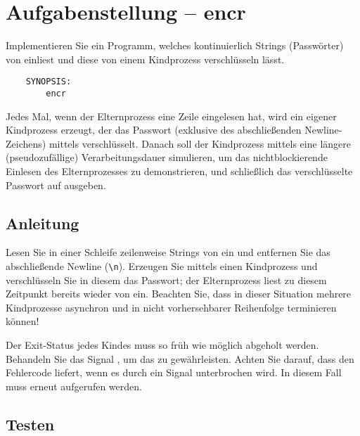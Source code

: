 




\section*{Aufgabenstellung -- encr}

Implementieren Sie ein Programm, welches kontinuierlich Strings
(Passwörter) von  einliest und diese von einem Kindprozess
verschlüsseln lässt.

\begin{verbatim}
    SYNOPSIS:
        encr
\end{verbatim}

Jedes Mal, wenn der Elternprozess eine Zeile eingelesen hat, wird ein
eigener Kindprozess erzeugt, der das Passwort (exklusive des
abschließenden Newline-Zeichens) mittels 
verschlüsselt. Danach soll der Kindprozess mittels 
eine längere (pseudozufällige) Verarbeitungsdauer simulieren, um das
nichtblockierende Einlesen des Elternprozesses zu demonstrieren, und
schließlich das verschlüsselte Passwort auf  ausgeben.

\subsection*{Anleitung}

Lesen Sie in einer Schleife zeilenweise Strings von  ein
und entfernen Sie das abschließende Newline (\verb+\n+). Erzeugen Sie
mittels  einen Kindprozess und verschlüsseln Sie in
diesem das Passwort; der Elternprozess liest zu diesem Zeitpunkt
bereits wieder von  ein. Beachten Sie, dass in dieser
Situation mehrere Kindprozesse asynchron und in nicht vorhersehbarer
Reihenfolge terminieren können!

Der Exit-Status jedes Kindes muss so früh wie möglich abgeholt werden.
Behandeln Sie das Signal , um das zu gewährleisten.
Achten Sie darauf, dass  den Fehlercode 
liefert, wenn es durch ein Signal unterbrochen wird. In diesem Fall
muss  erneut aufgerufen werden.

\subsection*{Testen}

